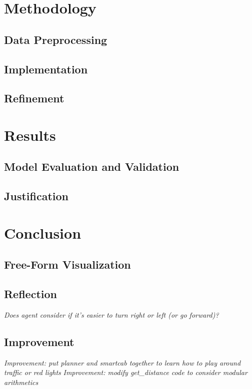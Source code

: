 \documentclass{article}
\begin{document}
\section{Methodology}

\subsection{Data Preprocessing}
\subsection{Implementation}
\subsection{Refinement}

\section{Results}

\subsection{Model Evaluation and Validation}
\subsection{Justification}


\section{Conclusion}

\subsection{Free-Form Visualization}
\subsection{Reflection}
\textit{Does agent consider if it's easier to turn right or left (or go forward)?}
\subsection{Improvement}
\textit{Improvement: put planner and smartcab together to learn how to play around traffic or red lights}
\textit{Improvement: modify get_distance code to consider modular arithmetics}
\end{document}
